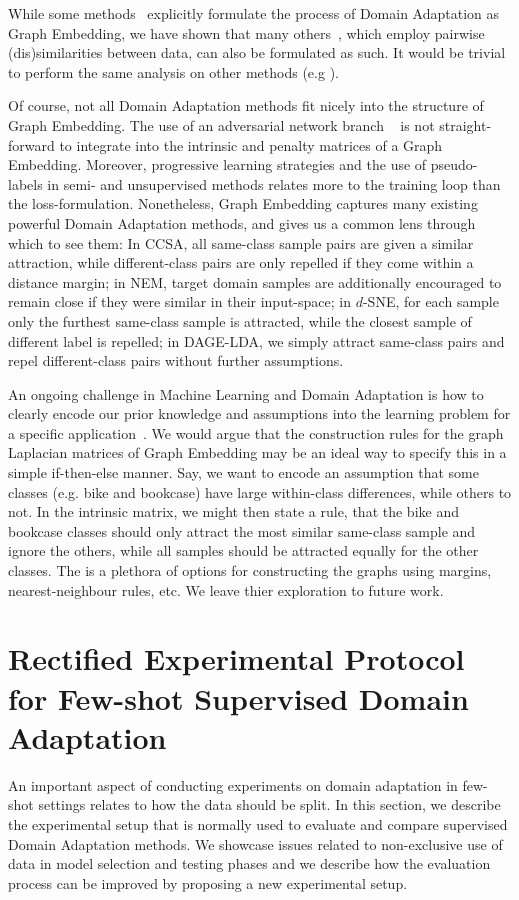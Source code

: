 \documentclass[journal]{IEEEtran}
\begin{document}
While some methods~\cite{ghifary2017sca, chen2019gef, hedegaard2020supervised} explicitly formulate the process of Domain Adaptation as Graph Embedding, we have shown that many others~\cite{motiian2017ccsa, xu2019dsne, wang2019nem}, which employ pairwise (dis)similarities between data, can also be formulated as such. It would be trivial to perform the same analysis on other methods (e.g \cite{koniusz2017domain}).

Of course, not all Domain Adaptation methods fit nicely into the structure of Graph Embedding. The use of an adversarial network branch ~\cite{tzeng2015simultaneous, ganin2016domain, long2018conditional} is not straight-forward to integrate into the intrinsic and penalty matrices of a Graph Embedding. Moreover, progressive learning strategies and the use of pseudo-labels in semi- and unsupervised methods \cite{wang2019nem, chen2019gef} relates more to the training loop than the loss-formulation.
Nonetheless, Graph Embedding captures many existing powerful Domain Adaptation methods, and gives us a common lens through which to see them: 
In CCSA, all same-class sample pairs are given a similar attraction, while different-class pairs are only repelled if they come within a distance margin; 
in NEM, target domain samples are additionally encouraged to remain close if they were similar in their input-space;
in $d$-SNE, for each sample only the furthest same-class sample is attracted, while the closest sample of different label is repelled; in DAGE-LDA, we simply attract same-class pairs and repel different-class pairs without further assumptions.

An ongoing challenge in Machine Learning and Domain Adaptation is how to clearly encode our prior knowledge and assumptions into the learning problem for a specific application~\cite{kouw2018introduction}.
We would argue that the construction rules for the graph Laplacian matrices of Graph Embedding may be an ideal way to specify this in a simple if-then-else manner. Say, we want to encode an assumption that some classes (e.g. bike and bookcase) have large within-class differences, while others to not. In the intrinsic matrix, we might then state a rule, that the bike and bookcase classes should only attract the most similar same-class sample and ignore the others, while all samples should be attracted equally for the other classes.
The is a plethora of options for constructing the graphs using margins, nearest-neighbour rules, etc. We leave thier exploration to future work.
 \section{Rectified Experimental Protocol for Few-shot Supervised Domain Adaptation} 
\label{sec:rectified-protocol}
An important aspect of conducting experiments on domain adaptation in few-shot settings relates to how the data should be split.
In this section, we describe the experimental setup that is normally used to evaluate and compare supervised Domain Adaptation methods. We showcase issues related to non-exclusive use of data in model selection and testing phases and we describe how the evaluation process can be improved by proposing a new experimental setup.
\end{document}
